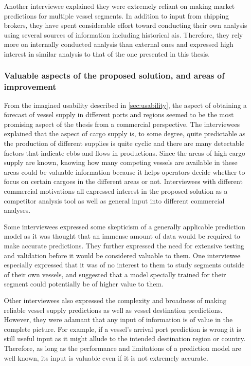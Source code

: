 Another interviewee explained they were extremely reliant on making market predictions for multiple vessel segments. In addition to input from shipping brokers, they have spent considerable effort toward conducting their own analysis using several sources of information including historical \acrshort{ais}. Therefore, they rely more on internally conducted analysis than external ones and expressed high interest in similar analysis to that of the one presented in this thesis.

\subsubsection{Valuable aspects of the proposed solution, and areas of improvement}

From the imagined usability described in \cref{sec:usability}, the aspect of obtaining a forecast of vessel supply in different ports and regions seemed to be the most promising aspect of the thesis from a commercial perspective. The interviewees explained that the aspect of cargo supply is, to some degree, quite predictable as the production of different supplies is quite cyclic and there are many detectable factors that indicate ebbs and flows in productions. Since the areas of high cargo supply are known, knowing how many competing vessels are available in these areas could be valuable information because it helps operators decide whether to focus on certain cargoes in the different areas or not. Interviewees with different commercial motivations all expressed interest in the proposed solution as a competitor analysis tool as well as general input into different commercial analyses.

Some interviewees expressed some skepticism of a generally applicable prediction model as it was thought that an immense amount of data would be required to make accurate predictions. They further expressed the need for extensive testing and validation before it would be considered valuable to them. One interviewee especially expressed that it was of no interest to them to study segments outside of their own vessels, and suggested that a model specially trained for their segment could potentially be of higher value to them.

Other interviewees also expressed the complexity and broadness of making reliable vessel supply predictions as well as vessel destination predictions. However, they were adamant that any input of information is of value in the complete picture. For example, if a vessel's arrival port prediction is wrong it is still useful input as it might allude to the intended destination region or country. Therefore, as long as the performance and limitations of a prediction model are well known, its input is valuable even if it is not extremely accurate.

